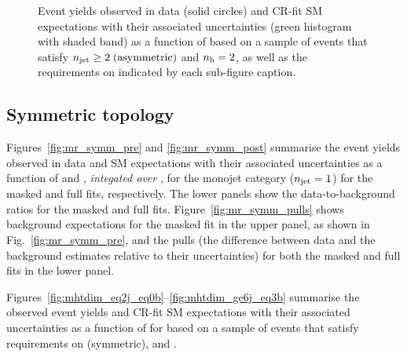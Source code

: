 \begin{figure}[h!]
\begin{center}
    \caption{Event yields observed in data (solid circles) and CR-fit SM expectations with their associated uncertainties (green histogram with shaded band) as a function of \HTmiss based on a sample of events that satisfy $n_{\text{jet}} \geq 2 \; \textrm{(asymmetric)}$ and $n_{\text{b}} = 2$, as well as the requirements on \scalht indicated by each sub-figure caption. }
    \label{fig:mhtdim_ge2a_eq2b}
  \end{center}
\end{figure}

\clearpage
\subsection{Symmetric topology}
\label{app:results-orig-symm}

Figures~\ref{fig:mr_symm_pre} and \ref{fig:mr_symm_post} summarise the
event yields observed in data and SM expectations with their
associated uncertainties as a function of \scalht and \nb, {\it
  integated over \mht}, for the monojet category ($n_{\text{jet}} = 1$) for the
masked and full fits, respectively. The lower panels show the
data-to-background ratios for the masked and full fits.
Figure~\ref{fig:mr_symm_pulls} shows background expectations for the
masked fit in the upper panel, as shown in Fig.~\ref{fig:mr_symm_pre},
and the pulls (\ie the difference between data and the background
estimates relative to their uncertainties) for both the masked and
full fits in the lower panel.

Figures~\ref{fig:mhtdim_eq2j_eq0b}--\ref{fig:mhtdim_ge6j_eq3b}
summarise the observed event yields and CR-fit SM expectations with
their associated uncertainties as a function of \HTmiss for based on a
sample of events that satisfy requirements on \njet (symmetric), \nb
and \scalht.

